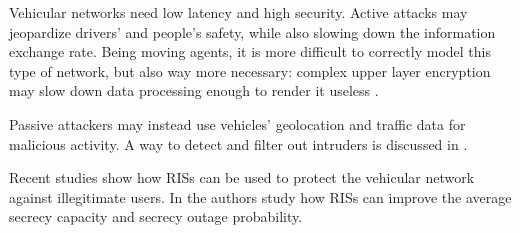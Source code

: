 Vehicular networks need low latency and high security. Active attacks may jeopardize drivers' and people's safety, while also slowing down the information exchange rate. Being moving agents, it is more difficult to correctly model this type of network, but also way more necessary: complex upper layer encryption may slow down data processing enough to render it useless \cite{8403278}.

Passive attackers may instead use vehicles' geolocation and traffic data for malicious activity. A way to detect and filter out intruders is discussed in \cite{8474336}.

Recent studies show how RISs can be used to protect the vehicular network against illegitimate users. In \cite{makarfi2020reconfigurableintelligentsurfacesenabledvehicular} the authors study how RISs can improve the average secrecy capacity and secrecy outage probability.